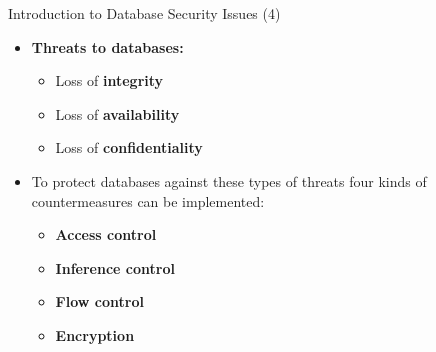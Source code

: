\begin{frame}{Introduction to Database Security Issues (4)}
    \Large
    
    \begin{itemize}
        
        \item \textbf{Threats to databases:}
        \vspace{0.2cm}
        \begin{itemize}
            \large 
            \setlength{\itemsep}{0.1cm}
            \item Loss of \textbf{integrity}
            \item Loss of \textbf{availability}
            \item Loss of \textbf{confidentiality}
        \end{itemize}
        
        \vspace{0.4cm}
        
        \item To protect databases against these types of threats four kinds of countermeasures can be implemented:
        \vspace{0.2cm}
        \begin{itemize}
            \large
            \setlength{\itemsep}{0.1cm}
            \item \textbf{Access control}
            \item \textbf{Inference control}
            \item \textbf{Flow control}
            \item \textbf{Encryption}
        \end{itemize}
        
    \end{itemize}
\end{frame}


